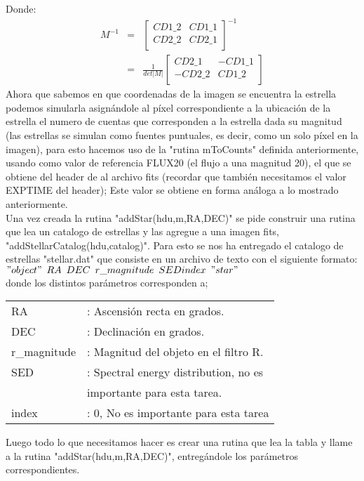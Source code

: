 \documentclass[twocolumn]{AS4201}
\begin{document}
Donde:
\begin{eqnarray}\nonumber
	M^{-1} & = &
	\left[\begin{array}{cc}
		CD1\_2 & CD1\_1\\ 
		CD2\_2 & CD2\_1\\
	\end{array}\right]^{-1} \\
	\nonumber
	& = & \frac{1}{det|M|}%
	\left[\begin{array}{cc}
		CD2\_1 & -CD1\_1\\ 
		-CD2\_2 & CD1\_2\\
	\end{array}\right]
\end{eqnarray}\label{estrella}
Ahora que sabemos en que coordenadas de la imagen se encuentra la estrella podemos simularla asignándole al píxel correspondiente a la ubicación de la estrella el numero de cuentas que corresponden a la estrella dada su magnitud (las estrellas se simulan como fuentes puntuales, es decir, como un solo píxel en la imagen), para esto hacemos uso de la "rutina mToCounts" definida anteriormente, usando como valor de referencia FLUX20 (el flujo a una magnitud 20), el que se obtiene del header de al archivo fits (recordar que también necesitamos el valor EXPTIME del header); Este valor se obtiene en forma análoga a lo mostrado anteriormente.\\
Una vez creada la rutina "addStar(hdu,m,RA,DEC)" se pide construir una rutina que lea un catalogo de estrellas y las agregue a una imagen fits, "addStellarCatalog(hdu,catalog)". Para esto se nos ha entregado el catalogo de estrellas "stellar.dat" que consiste en un archivo de texto con el siguiente formato:\\
$\\
"object"\hspace{5pt}RA\hspace{5pt}	DEC\hspace{5pt}	r\_magnitude\hspace{5pt}	SED	index\hspace{5pt}	"star"\\
$\\	
donde los distintos parámetros corresponden a;

\begin{flushleft}
	\label{table:2}      %
	\begin{tabular}{ll}        %
	RA&: Ascensión recta en grados. \\
	DEC&: Declinación en grados.  \\
	r\_magnitude&: Magnitud del objeto en el filtro R.\\
	SED&: Spectral energy distribution, no es \\ 
	 & importante para esta tarea. \\
	index&: 0, No es importante para esta tarea\\	
\end{tabular}\end{flushleft}
Luego todo lo que necesitamos hacer es crear una rutina que lea la tabla y llame a la rutina "addStar(hdu,m,RA,DEC)", entregándole los parámetros correspondientes.
\end{document}
